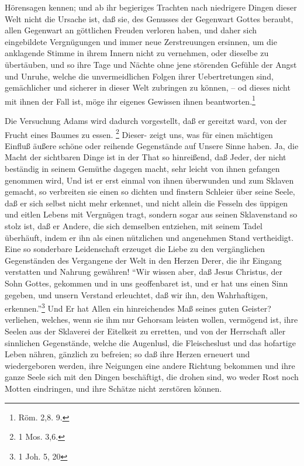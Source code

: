 Hörensagen kennen; und ab ihr begieriges Trachten nach niedrigere Dingen dieser
Welt nicht die Ursache ist, daß sie, des Genusses der Gegenwart Gottes beraubt,
allen Gegenwart an göttlichen Freuden verloren haben, und daher sich
eingebildete Vergnügungen und immer neue Zerstreuungen ersinnen, um die
anklagende Stimme in ihrem Innern nicht zu vernehmen, oder dieselbe zu
übertäuben, und so ihre Tage und Nächte ohne jene störenden Gefühle der Angst
und Unruhe, welche die unvermeidlichen Folgen ihrer Uebertretungen sind,
gemächlicher und sicherer in dieser Welt zubringen zu können, -- od dieses nicht
mit ihnen der Fall ist, möge ihr eigenes Gewissen ihnen
beantworten.\footnote{Röm. 2,8. 9.}

\medskip

Die Versuchung Adams wird dadurch vorgestellt, daß er gereitzt ward, von der
Frucht eines Baumes zu essen. \footnote{1 Mos. 3,6.} Dieser- zeigt uns, was für
einen mächtigen Einfluß äußere schöne oder reihende Gegenstände auf Unsere Sinne
haben. Ja, die Macht der sichtbaren Dinge ist in der That so hinreißend, daß
Jeder, der nicht beständig in seinem Gemüthe dagegen macht, sehr leicht von
ihnen gefangen genommen wird, Und ist er erst einmal von ihnen überwunden und
zum Sklaven gemacht, so verbreiten sie einen so dichten und finstern Schleier
über seine Seele, daß er sich selbst nicht mehr erkennet, und nicht allein die
Fesseln des üppigen und eitlen Lebens mit Vergnügen tragt, sondern sogar aus
seinen Sklavenstand so stolz ist, daß er Andere, die sich demselben entziehen,
mit seinem Tadel überhäuft, indem er ihn als einen nützlichen und angenehmen
Stand vertheidigt. Eine so sonderbare Leidenschaft erzeuget die Liebe zu den
vergänglichen Gegenständen des Vergangene der Welt in den Herzen Derer, die ihr
Eingang verstatten und Nahrung gewähren! "`Wir wissen aber, daß Jesus Christus,
der Sohn Gottes, gekommen und in uns geoffenbaret ist, und er hat uns einen Sinn
gegeben, und unsern Verstand erleuchtet, daß wir ihn, den Wahrhaftigen,
erkennen."'\footnote{1 Joh. 5, 20} Und Er hat Allen ein hinreichendes Maß seines
guten Geister? verliehen, welches, wenn sie ihm nur Gehorsam leisten wollen,
vermögend ist, ihre Seelen aus der Sklaverei der Eitelkeit zu erretten, und von
der Herrschaft aller sinnlichen Gegenstände, welche die Augenlusl, die
Fleischeslust und das hofartige Leben nähren, gänzlich zu befreien; so daß ihre
Herzen erneuert und wiedergeboren werden, ihre Neigungen eine andere Richtung
bekommen und ihre ganze Seele sich mit den Dingen beschäftigt, die drohen sind,
wo weder Rost noch Motten eindringen, und ihre Schätze nicht zerstören können.

